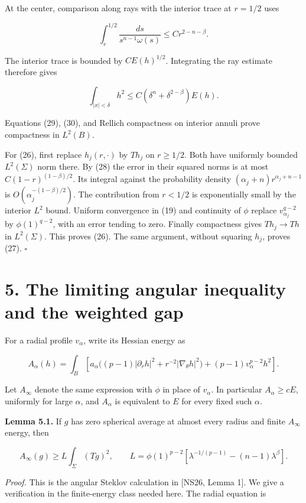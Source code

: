 \documentclass[11pt]{article}
\begin{document}
At the center, comparison along rays with the interior trace at
\(r=1/2\) uses

\[
\int_r^{1/2}\frac{ds}{s^{n-1}\omega(s)}\le Cr^{2-n-\beta}.
\]

The interior trace is bounded by \(CE(h)^{1/2}\). Integrating the ray
estimate therefore gives

\[
\int_{|x|<\delta}h^2\le C(\delta^n+\delta^{2-\beta})E(h).
\tag{30}
\]

Equations (29), (30), and Rellich compactness on interior annuli prove
compactness in \(L^2(B)\).

For (26), first replace \(h_j(r,\cdot)\) by \(Th_j\) on \(r\ge1/2\).
Both have uniformly bounded \(L^2(\Sigma)\) norm there. By (28) the
error in their squared norms is at most \(C(1-r)^{(1-\beta)/2}\). Its
integral against the probability density
\((\alpha_j+n)r^{\alpha_j+n-1}\) is \(O(\alpha_j^{-(1-\beta)/2})\). The
contribution from \(r<1/2\) is exponentially small by the interior
\(L^2\) bound. Uniform convergence in (19) and continuity of \(\phi\)
replace \(v_{\alpha_j}^{q-2}\) by \(\phi(1)^{q-2}\), with an error
tending to zero. Finally compactness gives \(Th_j\to Th\) in
\(L^2(\Sigma)\). This proves (26). The same argument, without squaring
\(h_j\), proves (27). \(\square\)

\section{5. The limiting angular inequality and the weighted
gap}\label{the-limiting-angular-inequality-and-the-weighted-gap}

For a radial profile \(v_\alpha\), write its Hessian energy as

\[
A_\alpha(h)=\int_B\left[
 a_\alpha\bigl((p-1)|\partial_rh|^2+r^{-2}|\nabla_\theta h|^2\bigr)
 +(p-1)v_\alpha^{p-2}h^2\right].
\tag{31}
\]

Let \(A_\infty\) denote the same expression with \(\phi\) in place of
\(v_\alpha\). In particular \(A_\alpha\ge cE\), uniformly for large
\(\alpha\), and \(A_\alpha\) is equivalent to \(E\) for every fixed such
\(\alpha\).

\textbf{Lemma 5.1.} If \(g\) has zero spherical average at almost every
radius and finite \(A_\infty\) energy, then

\[
A_\infty(g)\ge L\int_\Sigma(Tg)^2,
\qquad
L=\phi(1)^{p-2}\left[\lambda^{-1/(p-1)}-(n-1)\lambda^\beta\right].
\tag{32}
\]

\emph{Proof.} This is the angular Steklov calculation in {[}NS26, Lemma
1{]}. We give a verification in the finite-energy class needed here. The
radial equation is
\end{document}
